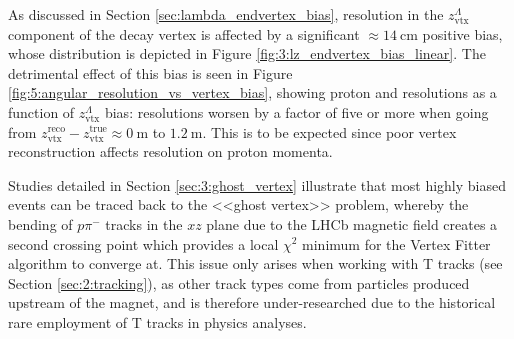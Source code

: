 As discussed in Section \ref{sec:lambda_endvertex_bias}, resolution in the $z_\text{vtx}^\Lambda$ component of the \lambdadecay decay vertex is affected by a significant $\approx \SI{14}{\centi\meter}$ positive bias, whose distribution is depicted in Figure \ref{fig:3:lz_endvertex_bias_linear}.
The detrimental effect of this bias is seen in Figure \ref{fig:5:angular_resolution_vs_vertex_bias}, showing proton \cthetap and \phip resolutions as a function of $z_\text{vtx}^\Lambda$ bias:
resolutions worsen by a factor of five or more when going from $z_\text{vtx}^\text{reco} - z_\text{vtx}^\text{true} \approx \SI{0}{\meter}$ to $\SI{1.2}{\meter}$.
This is to be expected since poor \lz vertex reconstruction affects resolution on proton momenta.


Studies detailed in Section \ref{sec:3:ghost_vertex} illustrate that most highly biased events can be traced back to the <<ghost vertex>> problem, whereby the bending of $p\pi^-$ tracks in the $xz$ plane due to the LHCb magnetic field creates a second crossing point which provides a local $\chi^2$ minimum for the Vertex Fitter algorithm to converge at.
This issue only arises when working with T tracks (see Section \ref{sec:2:tracking}), as other track types come from particles produced upstream of the magnet, and is therefore under-researched due to the historical rare employment of T tracks in physics analyses.

